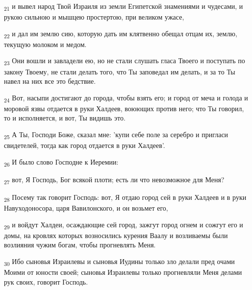 \begin{tcolorbox}
\textsubscript{21} и вывел народ Твой Израиля из земли Египетской знамениями и чудесами, и рукою сильною и мышцею простертою, при великом ужасе,
\end{tcolorbox}
\begin{tcolorbox}
\textsubscript{22} и дал им землю сию, которую дать им клятвенно обещал отцам их, землю, текущую молоком и медом.
\end{tcolorbox}
\begin{tcolorbox}
\textsubscript{23} Они вошли и завладели ею, но не стали слушать гласа Твоего и поступать по закону Твоему, не стали делать того, что Ты заповедал им делать, и за то Ты навел на них все это бедствие.
\end{tcolorbox}
\begin{tcolorbox}
\textsubscript{24} Вот, насыпи достигают до города, чтобы взять его; и город от меча и голода и моровой язвы отдается в руки Халдеев, воюющих против него; что Ты говорил, то и исполняется, и вот, Ты видишь это.
\end{tcolorbox}
\begin{tcolorbox}
\textsubscript{25} А Ты, Господи Боже, сказал мне: 'купи себе поле за серебро и пригласи свидетелей, тогда как город отдается в руки Халдеев'.
\end{tcolorbox}
\begin{tcolorbox}
\textsubscript{26} И было слово Господне к Иеремии:
\end{tcolorbox}
\begin{tcolorbox}
\textsubscript{27} вот, Я Господь, Бог всякой плоти; есть ли что невозможное для Меня?
\end{tcolorbox}
\begin{tcolorbox}
\textsubscript{28} Посему так говорит Господь: вот, Я отдаю город сей в руки Халдеев и в руки Навуходоносора, царя Вавилонского, и он возьмет его,
\end{tcolorbox}
\begin{tcolorbox}
\textsubscript{29} и войдут Халдеи, осаждающие сей город, зажгут город огнем и сожгут его и домы, на кровлях которых возносились курения Ваалу и возливаемы были возлияния чужим богам, чтобы прогневлять Меня.
\end{tcolorbox}
\begin{tcolorbox}
\textsubscript{30} Ибо сыновья Израилевы и сыновья Иудины только зло делали пред очами Моими от юности своей; сыновья Израилевы только прогневляли Меня делами рук своих, говорит Господь.
\end{tcolorbox}
